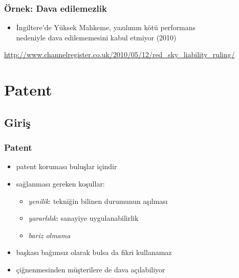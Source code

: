 \documentclass[dvipsnames]{beamer}
\theoremstyle{definition}
\theoremstyle{example}
\theoremstyle{plain}
\begin{document}
\begin{frame}
  \frametitle{Örnek: Dava edilemezlik}

  \begin{center}
  \end{center}

  \begin{itemize}
    \item İngiltere'de Yüksek Mahkeme, yazılımın kötü performans\\
      nedeniyle dava edilememesini kabul etmiyor (2010)
  \end{itemize}

  \medskip
  \tiny{\url{http://www.channelregister.co.uk/2010/05/12/red_sky_liability_ruling/}}\\
\end{frame}

\section{Patent}

\subsection{Giriş}

\begin{frame}
  \frametitle{Patent}
  
  \begin{itemize}
    \item patent koruması \alert{buluşlar} içindir

    \medskip
    \item sağlanması gereken koşullar:
    \begin{itemize}
      \item \emph{yenilik}: tekniğin bilinen durumunun aşılması
      \item \emph{yararlılık}: sanayiye uygulanabilirlik
      \item \emph{bariz olmama}
    \end{itemize}

    \pause
    \medskip
    \item başkası bağımsız olarak bulsa da fikri kullanamaz

    \pause
    \medskip
    \item çiğnenmesinden müşterilere de dava açılabiliyor
  \end{itemize}
\end{frame}
\end{document}
